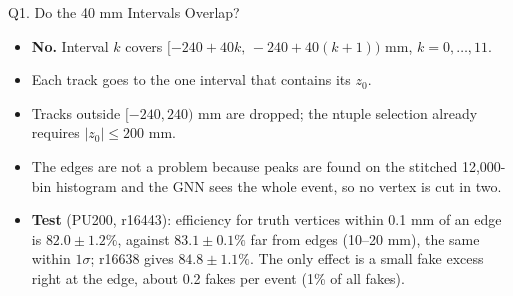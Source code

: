 
\begin{frame}{Q1. Do the 40 mm Intervals Overlap?}
\small
\begin{itemize}\setlength\itemsep{.45em}
\item \textbf{No.} Interval $k$ covers $[-240+40k,\,-240+40(k+1))$ mm, $k=0,\dots,11$.
\item Each track goes to the one interval that contains its $z_0$.
\item Tracks outside $[-240,240)$ mm are dropped; the ntuple selection already requires $|z_0|\le200$ mm.
\item The edges are not a problem because peaks are found on the stitched 12,000-bin histogram and the GNN sees the whole event, so no vertex is cut in two.
\item \textbf{Test} (PU200, r16443): efficiency for truth vertices within 0.1 mm of an edge is $82.0\pm1.2\%$, against $83.1\pm0.1\%$ far from edges (10--20 mm), the same within $1\sigma$; r16638 gives $84.8\pm1.1\%$. The only effect is a small fake excess right at the edge, about 0.2 fakes per event (1\% of all fakes).
\end{itemize}
\end{frame}


